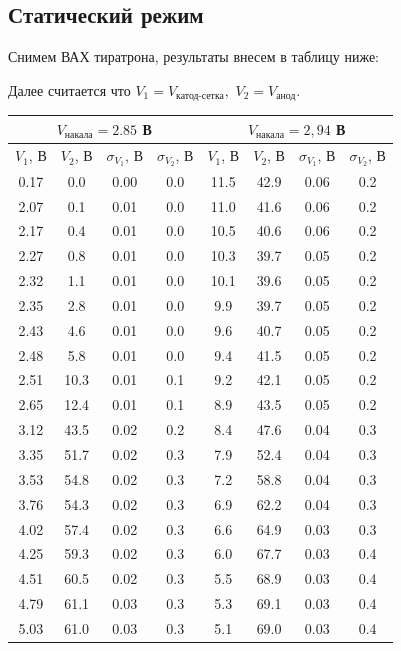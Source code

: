 \documentclass[a4paper,12pt]{extarticle}
\begin{document}
\newpage

\subsection*{Статический режим}
Снимем ВАХ тиратрона, результаты внесем в таблицу ниже:	

Далее считается что $V_1 = V_{\text{катод-сетка}},$ $V_2 = V_{\text{анод}}$.
\begin{table}[H]
\centering
\small
\begin{tabular}{|c|c|c|c|c|c|c|c|}
\hline
\multicolumn{4}{|c|}{$V_{\text{накала}} = 2.85$ В} & \multicolumn{4}{|c|}{$V_{\text{накала}} = 2,94$ В} \\ \hline
$V_1$, В& $V_2$, В& $\sigma_{V_1}$, В& $\sigma_{V_2}$, В& $V_1$, В& $V_2$, В& $\sigma_{V_1}$, В& $\sigma_{V_2}$, В\\ \hline
0.17& 0.0& 0.00& 0.0& 11.5& 42.9& 0.06& 0.2\\ \hline
2.07& 0.1& 0.01& 0.0& 11.0& 41.6& 0.06& 0.2\\ \hline
2.17& 0.4& 0.01& 0.0& 10.5& 40.6& 0.06& 0.2\\ \hline
2.27& 0.8& 0.01& 0.0& 10.3& 39.7& 0.05& 0.2\\ \hline
2.32& 1.1& 0.01& 0.0& 10.1& 39.6& 0.05& 0.2\\ \hline
2.35& 2.8& 0.01& 0.0& 9.9& 39.7& 0.05& 0.2\\ \hline
2.43& 4.6& 0.01& 0.0& 9.6& 40.7& 0.05& 0.2\\ \hline
2.48& 5.8& 0.01& 0.0& 9.4& 41.5& 0.05& 0.2\\ \hline
2.51& 10.3& 0.01& 0.1& 9.2& 42.1& 0.05& 0.2\\ \hline
2.65& 12.4& 0.01& 0.1& 8.9& 43.5& 0.05& 0.2\\ \hline
3.12& 43.5& 0.02& 0.2& 8.4& 47.6& 0.04& 0.3\\ \hline
3.35& 51.7& 0.02& 0.3& 7.9& 52.4& 0.04& 0.3\\ \hline
3.53& 54.8& 0.02& 0.3& 7.2& 58.8& 0.04& 0.3\\ \hline
3.76& 54.3& 0.02& 0.3& 6.9& 62.2& 0.04& 0.3\\ \hline
4.02& 57.4& 0.02& 0.3& 6.6& 64.9& 0.03& 0.3\\ \hline
4.25& 59.3& 0.02& 0.3& 6.0& 67.7& 0.03& 0.4\\ \hline
4.51& 60.5& 0.02& 0.3& 5.5& 68.9& 0.03& 0.4\\ \hline
4.79& 61.1& 0.03& 0.3& 5.3& 69.1& 0.03& 0.4\\ \hline
5.03& 61.0& 0.03& 0.3& 5.1& 69.0& 0.03& 0.4\\ \hline

\end{tabular}
\end{table}
\end{document}
